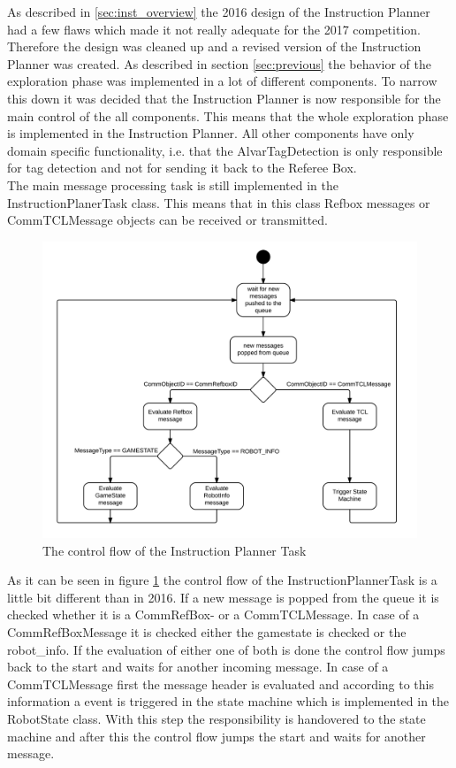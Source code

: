 As described in \ref{sec:inst_overview} the 2016 design of the Instruction Planner had a few flaws which made it not really adequate for the 2017 competition. Therefore the design was cleaned up and a revised version of the Instruction Planner was created. As described in section \ref{sec:previous} the behavior of the exploration phase was implemented in a lot of different components. To narrow this down it was decided that the Instruction Planner is now responsible for the main control of the all components. This means that the whole exploration phase is implemented in the Instruction Planner. All other components have only domain specific functionality, i.e. that the AlvarTagDetection is only responsible for tag detection and not for sending it back to the Referee Box. \\

The main message processing task is still implemented in the InstructionPlanerTask class. This means that in this class Refbox messages or CommTCLMessage objects can be received or transmitted. 


\begin{figure}[h]
\centering
\includegraphics[scale=0.25]{pic/InstructionPlannerTask.png}
\caption{The control flow of the Instruction Planner Task}
\label{fig:instructionplannertask}
\end{figure}
 
As it can be seen in figure \ref{fig:instructionplannertask} the control flow of the InstructionPlannerTask is a little bit different than in 2016. If a new message is popped from the queue it is checked whether it is a CommRefBox- or a CommTCLMessage. In case of a CommRefBoxMessage it is checked either the gamestate is checked or the robot\_info. If the evaluation of either one of both is done the control flow jumps back to the start and waits for another incoming message. In case of a CommTCLMessage first the message header is evaluated and according to this information a event is triggered in the state machine which is implemented in the RobotState class. With this step the responsibility is handovered to the state machine and after this the control flow jumps the start and waits for another message. \\ 



